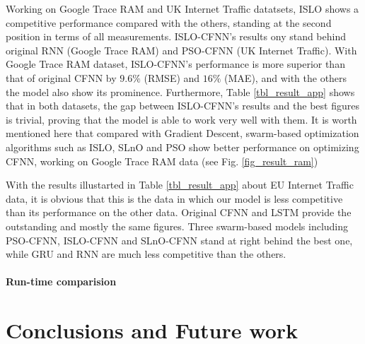\documentclass[a4paper,13pt,2p]{report}
\begin{document}
	Working on Google Trace RAM and UK Internet Traffic datatsets, ISLO shows a competitive performance compared with the others, standing at the second position in terms of all measurements. ISLO-CFNN's results ony stand behind original RNN (Google Trace RAM) and PSO-CFNN (UK Internet Traffic). With Google Trace RAM dataset, ISLO-CFNN's performance is more superior than that of original CFNN by $9.6 \%$ (RMSE) and $16 \%$ (MAE), and with the others the model also show its prominence. Furthermore, Table \ref{tbl_result_app} shows that in both datasets, the gap between ISLO-CFNN's results and the best figures is trivial, proving that the model is able to work very well with them. It is worth mentioned here that compared with Gradient Descent, swarm-based optimization algorithms such as ISLO, SLnO and PSO show better performance on optimizing CFNN, working on Google Trace RAM data (see Fig. \ref{fig_result_ram})
	
	With the results illustarted in Table \ref{tbl_result_app} about EU Internet Traffic data, it is obvious that this is the data in which our model is less competitive than its performance on the other data. Original CFNN and LSTM provide the outstanding and mostly the same figures. Three swarm-based models including PSO-CFNN, ISLO-CFNN and SLnO-CFNN stand at right behind the best one, while GRU and RNN are much less competitive than the others.

\subsubsection{Run-time comparision}

\chapter{Conclusions and Future work}

\appendix



%
%
\end{document}
